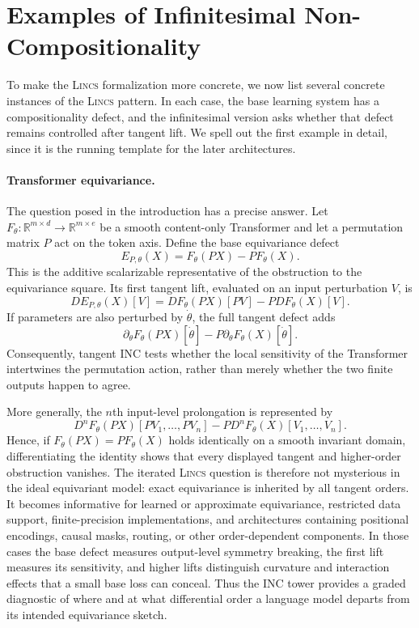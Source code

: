 \documentclass{article}
\begin{document}
\section{Examples of Infinitesimal Non-Compositionality}
\label{sec:inc-examples}

To make the \textsc{Lincs}   formalization more concrete, we now list several concrete instances of the \textsc{Lincs}   pattern. In each case, the base learning system has a compositionality defect, and the infinitesimal version asks whether that defect remains controlled after tangent lift. We spell out the first example in detail, since it is the running template for the later architectures.

\paragraph{Transformer equivariance.}\label{sec:transformer-equivariance}
The question posed in the introduction has a precise answer.  Let
$F_\theta:\mathbb R^{m\times d}\to\mathbb R^{m\times e}$ be a smooth
content-only Transformer and let a permutation matrix $P$ act on the token
axis.  Define the base equivariance defect
\[
E_{P,\theta}(X)=F_\theta(PX)-PF_\theta(X).
\]
This is the additive scalarizable representative of the obstruction to the
equivariance square.  Its first tangent lift, evaluated on an input
perturbation $V$, is
\[
D E_{P,\theta}(X)[V]
  =D F_\theta(PX)[PV]-P D F_\theta(X)[V].
\]
If parameters are also perturbed by $\dot\theta$, the full tangent defect adds
\[
\partial_\theta F_\theta(PX)[\dot\theta]
  -P\partial_\theta F_\theta(X)[\dot\theta].
\]
Consequently, tangent INC tests whether the local sensitivity of the
Transformer intertwines the permutation action, rather than merely whether
the two finite outputs happen to agree.

More generally, the $n$th input-level prolongation is represented by
\[
D^nF_\theta(PX)[PV_1,\ldots,PV_n]
  -P D^nF_\theta(X)[V_1,\ldots,V_n].
\]
Hence, if $F_\theta(PX)=PF_\theta(X)$ holds identically on a smooth invariant
domain, differentiating the identity shows that every displayed tangent and
higher-order obstruction vanishes.  The iterated \textsc{Lincs}   question is therefore
not mysterious in the ideal equivariant model: exact equivariance is inherited
by all tangent orders.  It becomes informative for learned or approximate
equivariance, restricted data support, finite-precision implementations, and
architectures containing positional encodings, causal masks, routing, or
other order-dependent components.  In those cases the base defect measures
output-level symmetry breaking, the first lift measures its sensitivity, and
higher lifts distinguish curvature and interaction effects that a small base
loss can conceal.  Thus the INC tower provides a graded diagnostic of where
and at what differential order a language model departs from its intended
equivariance sketch.
\end{document}
